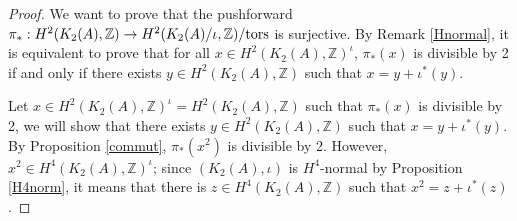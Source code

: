 \documentclass{alggeom}
\newcommand{\tors}{{\rm{tors}}}
\newcommand{\Z}{\mathbb{Z}}
\theoremstyle{plain}
\theoremstyle{definition}
\theoremstyle{remark}
\begin{document}
\begin{proof}
We want to prove that the pushforward  
$\pi_{*}:H^{2}(K_{2}(A),\Z)\rightarrow H^{2}(K_{2}(A)/\iota,\Z)/\tors$ is surjective. 
By Remark \ref{Hnormal}, it is equivalent to prove that for all $x\in H^{2}(K_{2}(A),\Z)^{\iota}$,
$\pi_{*}(x)$ is divisible by 2 if and only if there exists $y\in H^{2}(K_{2}(A),\Z)$ such that $x=y+\iota^{*}(y)$. 

Let $x\in H^{2}(K_{2}(A),\Z)^{\iota}=H^{2}(K_{2}(A),\Z)$ such that $\pi_{*}(x)$ is divisible by 2, we will show that there exists $y\in H^{2}(K_{2}(A),\Z)$ such that $x=y+\iota^{*}(y)$.
By Proposition \ref{commut}, $\pi_{*}(x^2)$ is divisible by 2.
However, $x^2\in H^{4}(K_{2}(A),\Z)^{\iota}$; since $(K_{2}(A),\iota)$ is $H^{4}$-normal by Proposition \ref{H4norm}, it means that there is $z\in H^{4}(K_{2}(A),\Z)$ such that
$x^2=z+\iota^{*}(z)$.


\end{proof}
\end{document}
